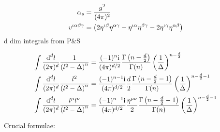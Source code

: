 \ifdefined\mainprogram{}
\else

\fi

\begin{align}
	\alpha_s &= \frac{g^2}{(4\pi)^2}
	\\
	v^{\iota\alpha\beta\gamma}
	&=\left(2\eta^{\iota\beta}\eta^{\alpha\gamma}
	-\eta^{\iota\alpha}\eta^{\beta\gamma}-
	2\eta^{\iota\gamma}\eta^{\alpha\beta}\right)
\end{align}
d dim integrals from P$\&$S

\begin{align}
\int \frac{\text{d} ^d l}{(2\pi)^d} \frac{1}{\left(l^2-\Delta\right)^n} 
&=
\frac{(-1)^n\text{i}}{(4\pi)^{d/2}} \frac{\Gamma\left(n-\frac{d}{2}\right)}{\Gamma(n)}\left(\frac{1}{\Delta}\right)^{n-\frac{d}{2}}
\\
\int \frac{\text{d} ^d l}{(2\pi)^d} \frac{l^2}{\left(l^2-\Delta\right)^n} 
&=
\frac{(-1)^{n-1}\text{i}}{(4\pi)^{d/2}}\frac{d}{2} \frac{\Gamma\left(n-\frac{d}{2}-1\right)}{\Gamma(n)}\left(\frac{1}{\Delta}\right)^{n-\frac{d}{2}-1}
\\
\int \frac{\text{d} ^d l}{(2\pi)^d} \frac{l^	\mu l^\nu}{\left(l^2-\Delta\right)^n} 
&=
\frac{(-1)^{n-1}\text{i}}{(4\pi)^{d/2}}\frac{\eta^{\mu \nu}}{2} \frac{\Gamma\left(n-\frac{d}{2}-1\right)}{\Gamma(n)}\left(\frac{1}{\Delta}\right)^{n-\frac{d}{2}-1}
\end{align}

Crucial formulae:

